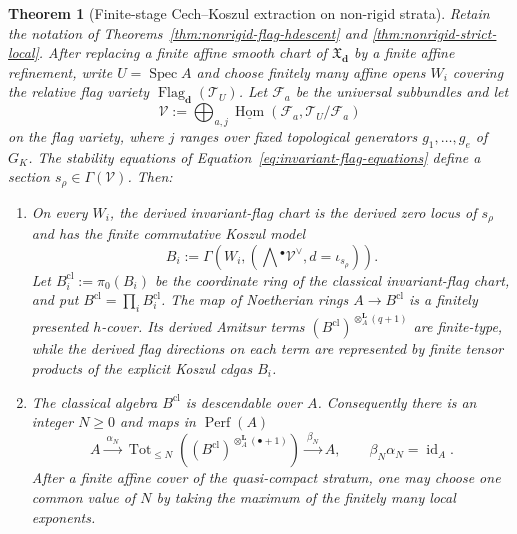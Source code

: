 \documentclass[11pt]{article}
\newtheorem{theorem}{Theorem}[section]
\theoremstyle{definition}
\begin{document}
\begin{theorem}[Finite-stage Cech--Koszul extraction on non-rigid strata]\label{thm:nonrigid-finite-stage-retract}
Retain the notation of Theorems~\ref{thm:nonrigid-flag-hdescent} and
\ref{thm:nonrigid-strict-local}.  After replacing a finite affine smooth chart
of $\mathfrak X_{\mathbf d}$ by a finite affine refinement, write
$U=\operatorname{Spec}A$ and choose finitely many affine opens $W_i$ covering
the relative flag variety $\operatorname{Flag}_{\mathbf d}(\mathcal T_U)$.
Let $\mathcal F_a$ be the universal subbundles and let
\[
 \mathcal V
 :=\bigoplus_{a,j}
 \underline{\operatorname{Hom}}
 \left(\mathcal F_a,\mathcal T_U/\mathcal F_a\right)
\]
on the flag variety, where $j$ ranges over fixed topological generators
$g_1,\ldots,g_e$ of $G_K$.  The stability equations of
Equation~\eqref{eq:invariant-flag-equations} define a section
$s_\rho\in\Gamma(\mathcal V)$.  Then:

\begin{enumerate}[label=\textnormal{(\roman*)}]
\item On every $W_i$, the derived invariant-flag chart is the derived zero
locus of $s_\rho$ and has the finite commutative Koszul model
\begin{equation}\label{eq:invariant-flag-koszul-cdga}
 B_i
 :=\Gamma\!\left(
 W_i,
 \left(\bigwedge{}^\bullet\mathcal V^\vee,
 d=\iota_{s_\rho}\right)
 \right).
\end{equation}
Let $B_i^{\mathrm{cl}}:=\pi_0(B_i)$ be the coordinate ring of the
classical invariant-flag chart, and put
$B^{\mathrm{cl}}=\prod_iB_i^{\mathrm{cl}}$.  The map of Noetherian rings
$A\to B^{\mathrm{cl}}$ is a finitely presented $h$-cover.  Its derived
Amitsur terms
$(B^{\mathrm{cl}})^{\otimes_A^{\mathbf L}(q+1)}$ are finite-type, while
the derived flag directions on each term are represented by finite tensor
products of the explicit Koszul cdgas $B_i$.

\item The classical algebra $B^{\mathrm{cl}}$ is descendable over $A$.
Consequently there is an integer $N\ge0$ and maps in
$\operatorname{Perf}(A)$
\begin{equation}\label{eq:finite-stage-unit-retract}
 A\xrightarrow{\ \alpha_N\ }
 \operatorname{Tot}_{\le N}
 \left((B^{\mathrm{cl}})^{\otimes_A^{\mathbf L}(\bullet+1)}\right)
 \xrightarrow{\ \beta_N\ }A,
 \qquad
 \beta_N\alpha_N=\operatorname{id}_A.
\end{equation}
After a finite affine cover of the quasi-compact stratum, one may choose one
common value of $N$ by taking the maximum of the finitely many local
exponents.


\end{enumerate}
\end{theorem}
\end{document}
